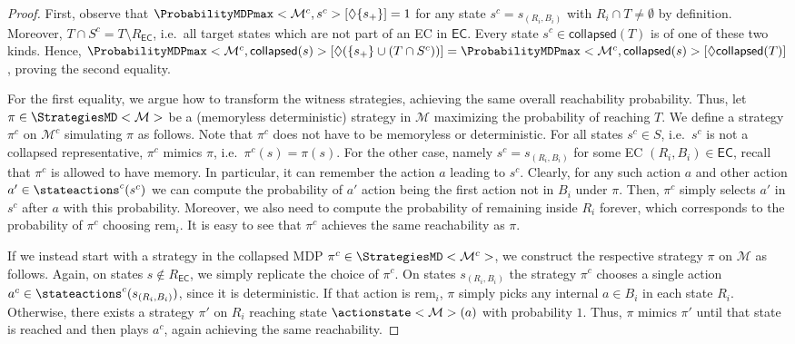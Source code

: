 \documentclass{theoretics}
\newcommand{\unionSym}{\cup}
\newcommand{\unionBin}{\mathbin{\unionSym}}
\newcommand{\intersectionSym}{\cap}
\newcommand{\intersectionBin}{\mathbin{\intersectionSym}}
\newcommand{\union}{\unionBin}
\newcommand{\intersection}{\intersectionBin}
\newcommand{\MDP}{\mathcal{M}}
\newcommand{\States}{S}
\newcommand{\strategy}{\pi}
\newcommand{\reach}{\Diamond}
\newcommand{\targetstate}{s_+}
\newcommand{\targetset}{T}
\newcommand{\ecremain}{\mathrm{rem}}
\newcommand{\eccollapsed}{\mathsf{collapsed}}
\newcommand{\algoecs}{\mathsf{EC}}
\begin{document}
\begin{proof}
	First, observe that $\ProbabilityMDPmax<\MDP^c, s^c>[\reach \{\targetstate\}] = 1$ for any state $s^c = s_{(R_i, B_i)}$ with $R_i \intersection \targetset \neq \emptyset$ by definition.
	Moreover, $\targetset \intersection \States^c = \targetset \setminus R_\algoecs$, i.e.\ all target states which are not part of an EC in $\algoecs$.
	Every state $s^c \in \eccollapsed(\targetset)$ is of one of these two kinds.
	Hence, $\ProbabilityMDPmax<\MDP^c, \eccollapsed(s)>[\reach (\{\targetstate\} \union (\targetset \intersection \States^c))] = \ProbabilityMDPmax<\MDP^c, \eccollapsed(s)>[\reach \eccollapsed(\targetset)]$, proving the second equality.

	For the first equality, we argue how to transform the witness strategies, achieving the same overall reachability probability.
	Thus, let $\strategy \in \StrategiesMD<\MDP>$ be a (memoryless deterministic) strategy in $\MDP$ maximizing the probability of reaching $\targetset$.
	We define a strategy $\strategy^c$ on $\MDP^c$ simulating $\strategy$ as follows.
	Note that $\strategy^c$ does not have to be memoryless or deterministic.
	For all states $s^c \in \States$, i.e.\ $s^c$ is not a collapsed representative, $\strategy^c$ mimics $\strategy$, i.e.\ $\strategy^c(s) = \strategy(s)$.
	For the other case, namely $s^c = s_{(R_i, B_i)}$ for some EC $(R_i, B_i) \in \algoecs$, recall that $\strategy^c$ is allowed to have memory.
	In particular, it can remember the action $a$ leading to $s^c$.
	Clearly, for any such action $a$ and other action $a' \in \stateactions^c(s^c)$ we can compute the probability of $a'$ action being the first action not in $B_i$ under $\strategy$.
	Then, $\strategy^c$ simply selects $a'$ in $s^c$ after $a$ with this probability.
	Moreover, we also need to compute the probability of remaining inside $R_i$ forever, which corresponds to the probability of $\strategy^c$ choosing $\ecremain_i$.
	It is easy to see that $\strategy^c$ achieves the same reachability as $\strategy$.

	If we instead start with a strategy in the collapsed MDP $\strategy^c \in \StrategiesMD<\MDP^c>$, we construct the respective strategy $\strategy$ on $\MDP$ as follows.
	Again, on states $s \notin R_\algoecs$, we simply replicate the choice of $\strategy^c$.
	On states $s_{(R_i, B_i)}$ the strategy $\strategy^c$ chooses a single action $a^c \in \stateactions^c(s_{(R_i, B_i)})$, since it is deterministic.
	If that action is $\ecremain_i$, $\strategy$ simply picks any internal $a \in B_i$ in each state $R_i$.
	Otherwise, there exists a strategy $\strategy'$ on $R_i$ reaching state $\actionstate<\MDP>(a)$ with probability $1$.
	Thus, $\strategy$ mimics $\strategy'$ until that state is reached and then plays $a^c$, again achieving the same reachability. 
\end{proof}
\end{document}
